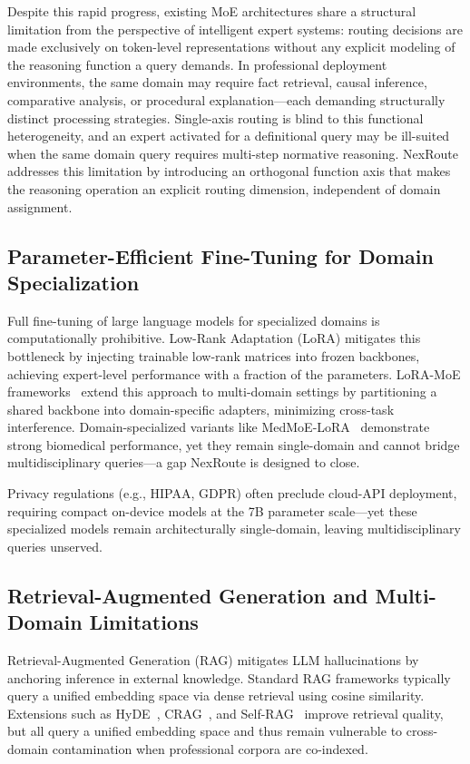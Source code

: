 \documentclass[a4paper,fleql]{cas-sc}
\begin{document}
Despite this rapid progress, existing MoE architectures share a structural
limitation from the perspective of intelligent expert systems: routing decisions
are made exclusively on token-level representations without any explicit
modeling of the reasoning function a query demands. In professional deployment
environments, the same domain may require fact retrieval, causal inference,
comparative analysis, or procedural explanation---each demanding structurally
distinct processing strategies. Single-axis routing is blind to this
functional heterogeneity, and an expert activated for a definitional query
may be ill-suited when the same domain query requires multi-step normative
reasoning. NexRoute addresses this limitation by introducing an orthogonal
function axis that makes the reasoning operation an explicit routing
dimension, independent of domain assignment.

\subsection{Parameter-Efficient Fine-Tuning for Domain Specialization}
Full fine-tuning of large language models for specialized domains is
computationally prohibitive. Low-Rank Adaptation (LoRA) \citep{hu2022lora}
mitigates this bottleneck by injecting trainable low-rank matrices into frozen
backbones, achieving expert-level performance with a fraction of the parameters.
LoRA-MoE frameworks~\citep{dou2024loramoe,wu2024mixtureofloras} extend this
approach to multi-domain settings by partitioning a shared backbone into
domain-specific adapters, minimizing cross-task interference.
Domain-specialized variants like MedMoE-LoRA~\citep{yang2025medmoelora}
demonstrate strong biomedical performance, yet they remain single-domain and
cannot bridge multidisciplinary queries---a gap NexRoute is designed to close.

Privacy regulations (e.g., HIPAA, GDPR) often preclude cloud-API deployment,
requiring compact on-device models at the 7B parameter scale---yet these
specialized models remain architecturally single-domain, leaving multidisciplinary
queries unserved.

\subsection{Retrieval-Augmented Generation and Multi-Domain Limitations}
Retrieval-Augmented Generation (RAG) \citep{lewis2020rag} mitigates LLM hallucinations by anchoring inference in external knowledge. Standard RAG frameworks typically query a unified embedding space via dense retrieval \citep{karpukhin2020dense} using cosine similarity. Extensions such as HyDE~\citep{gao2023hyde}, CRAG~\citep{yan2024crag}, and
Self-RAG~\citep{asai2023selfrag} improve retrieval quality, but all query a
unified embedding space and thus remain vulnerable to cross-domain contamination
when professional corpora are co-indexed.
\end{document}
